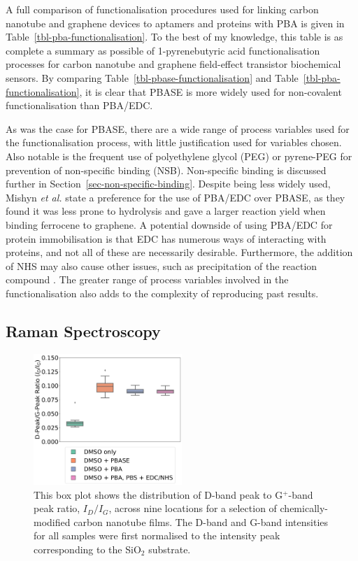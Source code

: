 \documentclass[
  a4paper,
]{scrbook}
\begin{document}
A full comparison of functionalisation procedures used for linking
carbon nanotube and graphene devices to aptamers and proteins with PBA
is given in Table~\ref{tbl-pba-functionalisation}. To the best of my
knowledge, this table is as complete a summary as possible of
1-pyrenebutyric acid functionalisation processes for carbon nanotube and
graphene field-effect transistor biochemical sensors. By comparing
Table~\ref{tbl-pbase-functionalisation} and
Table~\ref{tbl-pba-functionalisation}, it is clear that PBASE is more
widely used for non-covalent functionalisation than PBA/EDC.

As was the case for PBASE, there are a wide range of process variables
used for the functionalisation process, with little justification used
for variables chosen. Also notable is the frequent use of polyethylene
glycol (PEG) or pyrene-PEG for prevention of non-specific binding (NSB).
Non-specific binding is discussed further in
Section~\ref{sec-non-specific-binding}. Despite being less widely used,
Mishyn \emph{et al.} \autocite{Mishyn2022} state a preference for the
use of PBA/EDC over PBASE, as they found it was less prone to hydrolysis
and gave a larger reaction yield when binding ferrocene to graphene. A
potential downside of using PBA/EDC for protein immobilisation is that
EDC has numerous ways of interacting with proteins, and not all of these
are necessarily desirable. Furthermore, the addition of NHS may also
cause other issues, such as precipitation of the reaction compound
\autocite{Hermanson2013-4}. The greater range of process variables
involved in the functionalisation also adds to the complexity of
reproducing past results.

\hypertarget{raman-spectroscopy}{%
\subsection{Raman Spectroscopy}\label{raman-spectroscopy}}

\begin{figure}

{\centering \includegraphics[width=0.5\textwidth,height=\textheight]{figures/ch7/comparison_raman.png}

}

\caption{\label{fig-linker-raman}This box plot shows the distribution of
D-band peak to G\(^+\)-band peak ratio, \(I_D/I_G\), across nine
locations for a selection of chemically-modified carbon nanotube films.
The D-band and G-band intensities for all samples were first normalised
to the intensity peak corresponding to the SiO\(_2\) substrate.}

\end{figure}
\end{document}
